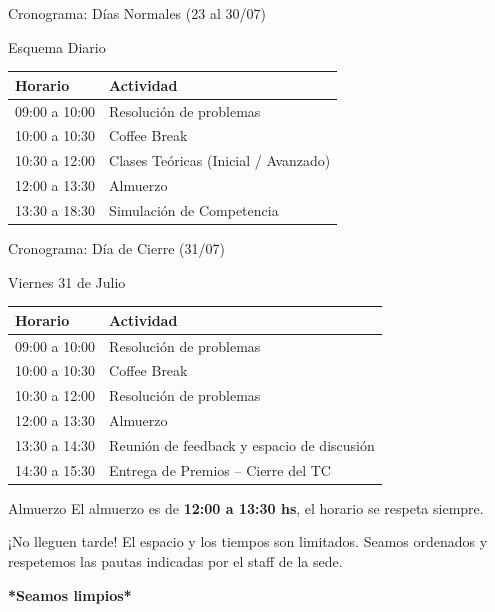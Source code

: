 \documentclass{beamer}
\begin{document}
\begin{frame}{Cronograma: Días Normales (23 al 30/07)}
    \begin{block}{Esquema Diario}
        \centering
        \begin{tabular}{|l|l|}
            \hline
            \textbf{Horario} & \textbf{Actividad} \\
            \hline
            09:00 a 10:00 & Resolución de problemas \\
            10:00 a 10:30 & Coffee Break \\
            10:30 a 12:00 & Clases Teóricas (Inicial / Avanzado) \\
            12:00 a 13:30 & Almuerzo \\
            13:30 a 18:30 & Simulación de Competencia \\
            \hline
        \end{tabular}
    \end{block}
\end{frame}

\begin{frame}{Cronograma: Día de Cierre (31/07)}
    \begin{block}{Viernes 31 de Julio}
        \centering
        \small
        \begin{tabular}{|l|l|}
            \hline
            \textbf{Horario} & \textbf{Actividad} \\
            \hline
            09:00 a 10:00 & Resolución de problemas \\
            10:00 a 10:30 & Coffee Break \\
            10:30 a 12:00 & Resolución de problemas \\
            12:00 a 13:30 & Almuerzo \\
            13:30 a 14:30 & Reunión de feedback y espacio de discusión \\
            14:30 a 15:30 & Entrega de Premios -- Cierre del TC \\
            \hline
        \end{tabular}
    \end{block}
\end{frame}

\begin{frame}{Almuerzo}
    \centering
    El almuerzo es de \textbf{12:00 a 13:30 hs}, el horario se respeta siempre.
    \vspace{0.3cm}
    \begin{alertblock}{¡No lleguen tarde!}
        El espacio y los tiempos son limitados. Seamos ordenados y respetemos las pautas indicadas por el staff de la sede.
    \end{alertblock}
    \vfill
    \textbf{*Seamos limpios*}
\end{frame}
\end{document}
